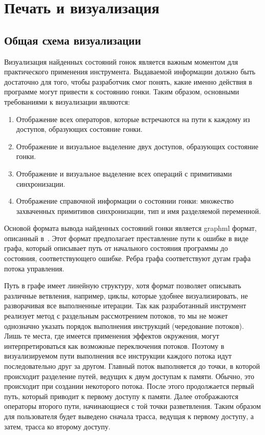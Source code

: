 \section{Печать и визуализация} \label{sect_impl_visualization}

\subsection{Общая схема визуализации}
Визуализация найденных состояний гонок является важным моментом для практического применения инструмента.
Выдаваемой информации должно быть достаточно для того, чтобы разработчик смог понять, какие именно действия в программе могут привести к состоянию гонки.
Таким образом, основными требованиями к визуализации являются:

\begin{enumerate}

\item Отображение всех операторов, которые встречаются на пути к каждому из доступов, образующих состояние гонки.

\item Отображение и визуальное выделение двух доступов, образующих состояние гонки.

\item Отображение и визуальное выделение всех операций с примитивами синхронизации.

\item Отображение справочной информации о состоянии гонки: множество захваченных примитивов синхронизации, тип и имя разделяемой переменной.

\end{enumerate}

Основой формата вывода найденных состояний гонки является graphml формат, описанный в~\cite{SVCOMP15,Witness,Witness2,Witness3}.
Этот формат предполагает преставление пути к ошибке в виде графа, который описывает путь от начального состояния программы до состояния, соответствующего ошибке.
Ребра графа соответствуют дугам графа потока управления.

Путь в графе имеет линейную структуру, хотя формат позволяет описывать различные ветвления, например, циклы, которые удобнее визуализировать, не разворачивая все выполненные итерации.
Так как разработанный инструмент реализует метод с раздельным рассмотрением потоков, то мы не может однозначно указать порядок выполнения инструкций (чередование потоков).
Лишь те места, где имеется применения эффектов окружения, могут интерпретироваться как возможные переключения потоков.
Поэтому в визуализируемом пути выполнения все инструкции каждого потока идут последовательно друг за другом.
Главный поток выполняется до точки, в которой происходит разделение путей, ведущих к двум доступам к памяти.
Обычно, это происходит при создании некоторого потока.
После этого продолжается первый путь, который приводит к первому доступу к памяти.
Далее отображаются операторы второго пути, начинающиеся с той точки разветвления.
Таким образом для пользователя будет выведено сначала трасса, ведущая к первому доступу, а затем, трасса ко второму доступу.

